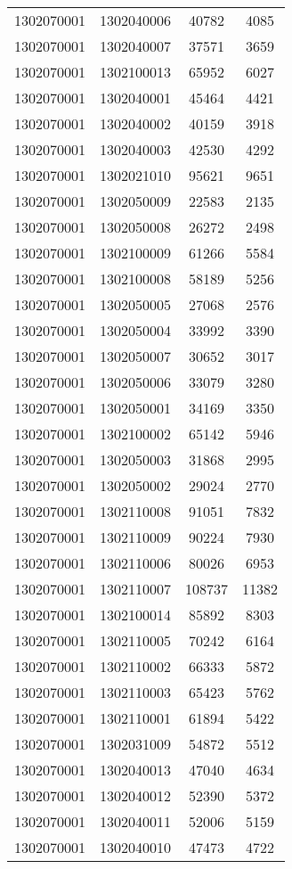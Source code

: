 \begin{longtable}{llcc}
1302070001 & 1302040006 & 40782 & 4085\\
1302070001 & 1302040007 & 37571 & 3659\\
1302070001 & 1302100013 & 65952 & 6027\\
1302070001 & 1302040001 & 45464 & 4421\\
1302070001 & 1302040002 & 40159 & 3918\\
1302070001 & 1302040003 & 42530 & 4292\\
1302070001 & 1302021010 & 95621 & 9651\\
1302070001 & 1302050009 & 22583 & 2135\\
1302070001 & 1302050008 & 26272 & 2498\\
1302070001 & 1302100009 & 61266 & 5584\\
1302070001 & 1302100008 & 58189 & 5256\\
1302070001 & 1302050005 & 27068 & 2576\\
1302070001 & 1302050004 & 33992 & 3390\\
1302070001 & 1302050007 & 30652 & 3017\\
1302070001 & 1302050006 & 33079 & 3280\\
1302070001 & 1302050001 & 34169 & 3350\\
1302070001 & 1302100002 & 65142 & 5946\\
1302070001 & 1302050003 & 31868 & 2995\\
1302070001 & 1302050002 & 29024 & 2770\\
1302070001 & 1302110008 & 91051 & 7832\\
1302070001 & 1302110009 & 90224 & 7930\\
1302070001 & 1302110006 & 80026 & 6953\\
1302070001 & 1302110007 & 108737 & 11382\\
1302070001 & 1302100014 & 85892 & 8303\\
1302070001 & 1302110005 & 70242 & 6164\\
1302070001 & 1302110002 & 66333 & 5872\\
1302070001 & 1302110003 & 65423 & 5762\\
1302070001 & 1302110001 & 61894 & 5422\\
1302070001 & 1302031009 & 54872 & 5512\\
1302070001 & 1302040013 & 47040 & 4634\\
1302070001 & 1302040012 & 52390 & 5372\\
1302070001 & 1302040011 & 52006 & 5159\\
1302070001 & 1302040010 & 47473 & 4722\\

\end{longtable}
